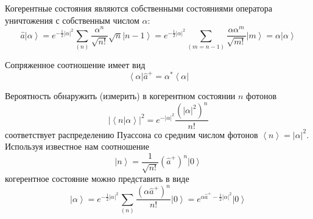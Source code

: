 Когерентные состояния являются собственными состояниями оператора
уничтожения с собственным числом $\alpha$: 
\begin{equation}
\hat{a}\left|\alpha\right> = e^{-\frac{1}{2} \left|\alpha\right|^2}
\sum_{(n)} \frac{\alpha^n}{\sqrt{n!}}\sqrt{n}\left|n - 1\right> = 
e^{-\frac{1}{2} \left|\alpha\right|^2}
\sum_{(m = n - 1)} \frac{\alpha \alpha^m}{\sqrt{m!}}\left|m\right> = 
\alpha\left|\alpha\right>
\end{equation}

Сопряженное соотношение имеет вид
\begin{equation}
\left<\alpha\right|\hat{a}^{+} =  
\alpha^{*}\left<\alpha\right|
\end{equation}

Вероятность обнаружить (измерить) в когерентном состоянии $n$ фотонов
\begin{equation}
\left|\left<n\right|\left.\alpha\right>\right|^2 =
e^{-\left|\alpha\right|^2}
\frac{\left(\left|\alpha\right|^2\right)^n}{n!}
\label{eqCh1_PuassonCoh}
\end{equation}
соответствует распределению Пуассона со средним числом фотонов  
$\left<n\right> = \left|\alpha\right|^2$.  Используя известное нам
соотношение 
\begin{equation}
\left|n\right> = \frac{1}{\sqrt{n!}}
\left(\hat{a}^{+}\right)^n\left|0\right>
\label{eqCh1_nstate}
\end{equation}
когерентное состояние можно представить в виде
\begin{equation}
\left|\alpha\right> = e^{-\frac{1}{2} \left|\alpha\right|^2}\sum_{(n)}
\frac{\left(\alpha \hat{a}^{+}\right)^n}{n!}\left|0\right> = 
e^{\alpha \hat{a}^{+} -
  \frac{1}{2}\left|\alpha\right|^2}\left|0\right>
\label{eqCh1_astate}
\end{equation}

